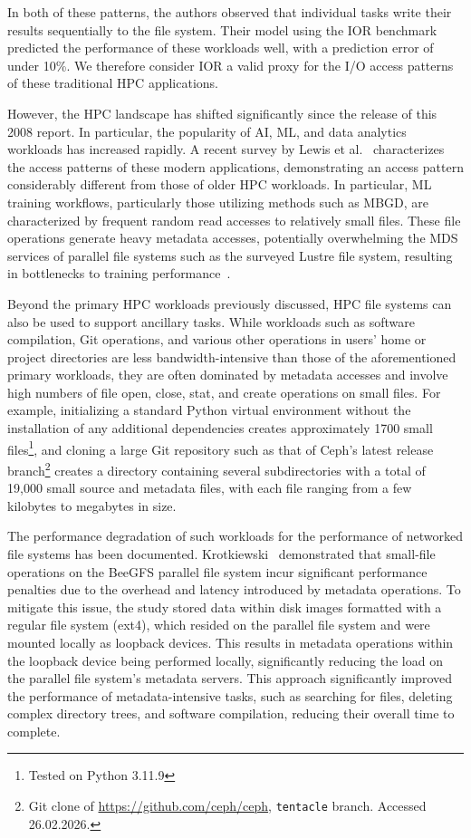 In both of these patterns, the authors observed that individual tasks write their results sequentially to the file system. Their model using the \ac{IOR} benchmark predicted the performance of these workloads well, with a prediction error of under 10\%. We therefore consider \ac{IOR} a valid proxy for the \ac{I/O} access patterns of these traditional \ac{HPC} applications.

However, the \ac{HPC} landscape has shifted significantly since the release of this 2008 report. In particular, the popularity of \ac{AI}, \ac{ML}, and data analytics workloads has increased rapidly. A recent survey by Lewis et al.~\cite{lewis_io_2025} characterizes the access patterns of these modern applications, demonstrating an access pattern considerably different from those of older \ac{HPC} workloads. In particular, \ac{ML} training workflows, particularly those utilizing methods such as \ac{MBGD}, are characterized by frequent random read accesses to relatively small files. These file operations generate heavy metadata accesses, potentially overwhelming the \ac{MDS} services of parallel file systems such as the surveyed Lustre file system, resulting in bottlenecks to training performance~\cite[p.~18]{lewis_io_2025}.

Beyond the primary \ac{HPC} workloads previously discussed, \ac{HPC} file systems can also be used to support ancillary tasks. While workloads such as software compilation, Git operations, and various other operations in users' home or project directories are less bandwidth-intensive than those of the aforementioned primary workloads, they are often dominated by metadata accesses and involve high numbers of file open, close, stat, and create operations on small files. For example, initializing a standard Python virtual environment without the installation of any additional dependencies creates approximately 1700 small files\footnote{Tested on Python 3.11.9}, and cloning a large Git repository such as that of Ceph's latest release branch\footnote{Git clone of \url{https://github.com/ceph/ceph}, \texttt{tentacle} branch. Accessed 26.02.2026.} creates a directory containing several subdirectories with a total of 19,000 small source and metadata files, with each file ranging from a few kilobytes to megabytes in size.

The performance degradation of such workloads for the performance of networked file systems has been documented. Krotkiewski~\cite{Krotkiewski_2017} demonstrated that small-file operations on the BeeGFS parallel file system incur significant performance penalties due to the overhead and latency introduced by metadata operations. To mitigate this issue, the study stored data within disk images formatted with a regular file system (ext4), which resided on the parallel file system and were mounted locally as loopback devices. This results in metadata operations within the loopback device being performed locally, significantly reducing the load on the parallel file system's metadata servers. This approach significantly improved the performance of metadata-intensive tasks, such as searching for files, deleting complex directory trees, and software compilation, reducing their overall time to complete.

